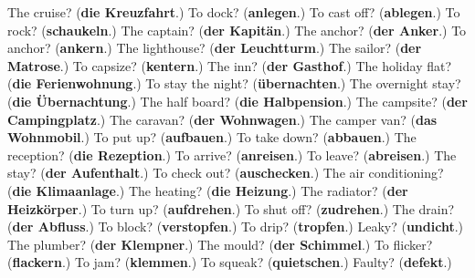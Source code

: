 \begin{tcolorbox}[breakable,colback=teal!4,colframe=teal!35!black,title={Before you move on}]
The cruise? (\textbf{die Kreuzfahrt}.) To dock? (\textbf{anlegen}.) To cast off? (\textbf{ablegen}.) To rock? (\textbf{schaukeln}.) The captain? (\textbf{der Kapitän}.) The anchor? (\textbf{der Anker}.) To anchor? (\textbf{ankern}.) The lighthouse? (\textbf{der Leuchtturm}.) The sailor? (\textbf{der Matrose}.) To capsize? (\textbf{kentern}.) The inn? (\textbf{der Gasthof}.) The holiday flat? (\textbf{die Ferienwohnung}.) To stay the night? (\textbf{übernachten}.) The overnight stay? (\textbf{die Übernachtung}.) The half board? (\textbf{die Halbpension}.) The campsite? (\textbf{der Campingplatz}.) The caravan? (\textbf{der Wohnwagen}.) The camper van? (\textbf{das Wohnmobil}.) To put up? (\textbf{aufbauen}.) To take down? (\textbf{abbauen}.) The reception? (\textbf{die Rezeption}.) To arrive? (\textbf{anreisen}.) To leave? (\textbf{abreisen}.) The stay? (\textbf{der Aufenthalt}.) To check out? (\textbf{auschecken}.) The air conditioning? (\textbf{die Klimaanlage}.) The heating? (\textbf{die Heizung}.) The radiator? (\textbf{der Heizkörper}.) To turn up? (\textbf{aufdrehen}.) To shut off? (\textbf{zudrehen}.) The drain? (\textbf{der Abfluss}.) To block? (\textbf{verstopfen}.) To drip? (\textbf{tropfen}.) Leaky? (\textbf{undicht}.) The plumber? (\textbf{der Klempner}.) The mould? (\textbf{der Schimmel}.) To flicker? (\textbf{flackern}.) To jam? (\textbf{klemmen}.) To squeak? (\textbf{quietschen}.) Faulty? (\textbf{defekt}.)
\end{tcolorbox}
